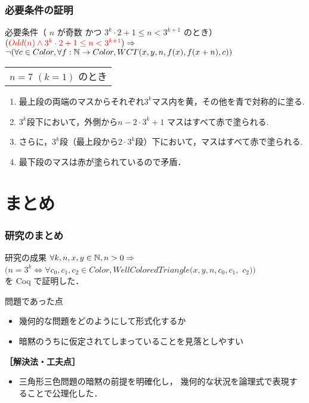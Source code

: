 \documentclass[dvipdfmx,cjk]{beamer}
\newcommand{\redt}[1]{\textcolor{red}{#1}}
\def\Color{\textit{Color}}
\def\WCT{\textit{WellColoredTriangle}}
\begin{document}
\begin{frame}
  \frametitle{必要条件の証明}
  \begin{block}{必要条件（ $n$ が奇数 かつ $3^k \cdot 2 + 1 \leq n < 3^{k+1}$ のとき）}
    $(\redt{Odd(n) \land 3^k \cdot 2 + 1 \leq n < 3^{k+1}}) \Imp$ \\
    $\lnot (\forall c \in Color, \forall f : \mathbb{N} \to Color, WCT(x,y,n,f(x),f(x+n),c))$
    \end{block}
  {\footnotesize
    \vfill
    \begin{center}
      \begin{tabular}{c}
        
        \\
        $n=7$ $(k=1)$ のとき
      \end{tabular}
    \end{center}
    \begin{enumerate}
    \item
      最上段の両端のマスからそれぞれ$3^k$マス内を黄，その他を青で対称的に塗る.
    \item
      $3^k$段下において，外側から$ n - 2 \cdot 3^k + 1$ マスはすべて赤で塗られる.
    \item
      さらに，$3^k$段（最上段から$2 \cdot 3^k$段）下において，マスはすべて赤で塗られる.
    \item
      最下段のマスは赤が塗られているので矛盾．
    \end{enumerate}
  } 
\end{frame}

\section{まとめ}

\begin{frame}
  \frametitle{研究のまとめ}
  \begin{block}{研究の成果}
    $\forall k, n, x, y \in \mathbb{N}, n > 0 \Rightarrow$
    $(n = 3 ^ k \Leftrightarrow \forall c_0, c_1, c_2 \in \Color,\WCT(x,y,n,c_0,c_1,$ $c_2))$ \\
    を Coq で証明した．
  \end{block}
  \vfill
  \begin{alertblock}{問題であった点}
    \begin{itemize}
    \item
      幾何的な問題をどのようにして形式化するか
    \item
      暗黙のうちに仮定されてしまっていることを見落としやすい
    \end{itemize}
  \end{alertblock}
  \vfill
  \textbf{［解決法・工夫点］}
  \begin{itemize}
  \item
    三角形三色問題の暗黙の前提を明確化し，
    幾何的な状況を論理式で表現することで公理化した．
  \end{itemize}
\end{frame}
\end{document}
